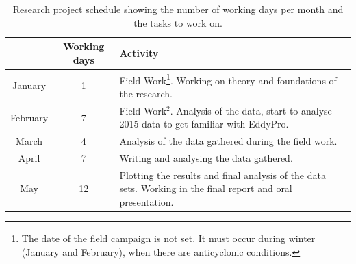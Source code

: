 \documentclass[a4paper,12pt]{article}
\begin{document}
\begin{table}[ht!]
\begin{center}
\begin{tabular}{|c|c|p{9.5cm}|}
\hline
  & \textbf{Working days} & \textbf{Activity} \\
\hline
January & 1 & Field Work\footnote{\label{note1}The date of the field campaign is not set. It must occur during winter (January and February), when there are anticyclonic conditions.}. Working on theory and foundations of the research.\\
\hline
February & 7 & Field Work$^2$. Analysis of the data, start to analyse 2015 data to get familiar with EddyPro.\\
\hline
March & 4 & Analysis of the data gathered during the field work.\\
\hline
April & 7 & Writing and analysing the data gathered.\\
\hline
May & 12 & Plotting the results and final analysis of the data sets. Working in the final report and oral presentation.\\
\hline
\end{tabular}
\caption{Research project schedule showing the number of working days per month and the tasks to work on.}
\label{table:schedule}
\end{center}
\end{table}



\clearpage


\end{document}
